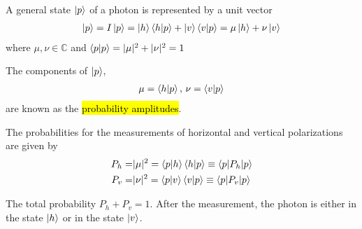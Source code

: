 A general state $\ket{p}$ of a photon is represented by a unit vector
\begin{align*}
    \ket{p}=I\ket{p}=\ket{h}\braket{h|p}+\ket{v}\braket{v|p}=\mu\ket{h}+\nu\ket{v}
\end{align*}
where $\mu,\nu \in \mathbb{C}$ and $\braket{p|p}=|\mu|^2+|\nu|^2=1$

The components of $\ket{p}$, 
\begin{align*}
    \mu=\braket{h|p},\, \nu =\braket{v|p}
\end{align*}
are known as the \hl{probability amplitudes}.

The probabilities for the measurements of horizontal and vertical polarizations are given by
\begin{align*}
    P_h=& |\mu|^2=\braket{p|h}\braket{h|p}\equiv \braket{p | P_h | p} \\
    P_v=& |\nu|^2=\braket{p|v}\braket{v|p}\equiv \braket{p | P_v | p}
\end{align*}

The total probability $P_h+P_v=1$. After the measurement, the photon is either in the state $\ket{h}$ or in the state $\ket{v}$.